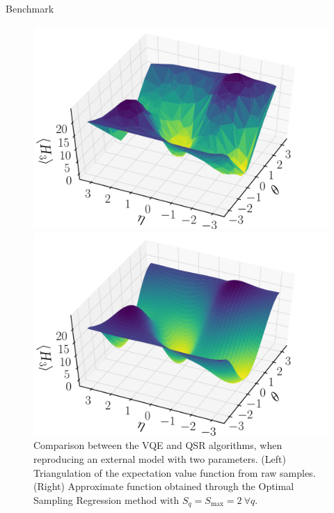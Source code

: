 \begin{frame}{Benchmark}

  \begin{figure}[!tbp]
  	\centering
  	\begin{minipage}[c]{.40\linewidth}
  		\centering
  		\includegraphics[width=\linewidth]{Figures/chapter05/deuteron-VQE}
  	\end{minipage}
  	\hspace{.025\linewidth}
  	\begin{minipage}[c]{.40\linewidth}
  		\centering
  		\includegraphics[width=\linewidth]{Figures/chapter05/deuteron-QSR}
  	\end{minipage}
  	\caption{Comparison between the VQE and QSR algorithms, when reproducing an external model with two parameters. (Left) Triangulation of the expectation value function from raw samples. (Right) Approximate function obtained through the Optimal Sampling Regression method with $S_q=S_{\text{max}}=2 ~\forall q$.}
  \end{figure}


\end{frame}
